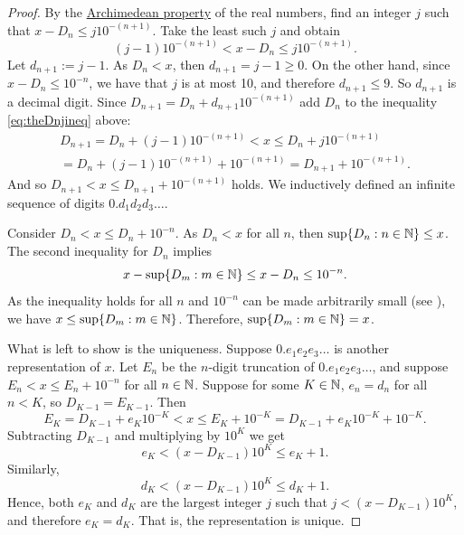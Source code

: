 \begin{proof}
By the 
\hyperref[thm:arch:i]{Archimedean property} of the real numbers,
find an integer $j$ such that
$x-D_n \leq j {10}^{-(n+1)}$.  Take the least such $j$ and obtain 
\begin{equation} \label{eq:theDnjineq}
(j-1){10}^{-(n+1)} < x-D_n \leq j {10}^{-(n+1)} .
\end{equation}
Let $d_{n+1} := j-1$.
As $D_n < x$,
then $d_{n+1} = j-1 \geq 0$.  On the other hand, since
$x-D_n \leq {10}^{-n}$, we have that
$j$ is at most 10, and therefore $d_{n+1} \leq 9$.
So $d_{n+1}$ is a
decimal digit.
Since $D_{n+1} = D_n + d_{n+1} {10}^{-(n+1)}$
add $D_n$ to the inequality
\eqref{eq:theDnjineq} above:
\begin{multline*}
D_{n+1} = D_n + (j-1){10}^{-(n+1)} < x
\leq
D_n + j {10}^{-(n+1)} \\
=
D_n + (j-1) {10}^{-(n+1)} +
{10}^{-(n+1)} = D_{n+1} + {10}^{-(n+1)} .
\end{multline*}
And so
$D_{n+1} < x \leq D_{n+1} + {10}^{-(n+1)}$ holds.
We inductively
defined an infinite sequence of digits $0.d_1d_2d_3\ldots$.

Consider $D_{n} < x \leq D_{n} + {10}^{-n}$.
As $D_n < x$ for all $n$, then
$\sup \{ D_n : n \in {\mathbb{N}} \} \leq x$.
The second inequality for $D_n$ implies
\begin{equation*}
x - \sup \{ D_m : m \in {\mathbb{N}} \}
\leq
x - D_n \leq 10^{-n} .
\end{equation*}
As the inequality holds for all $n$ and
${10}^{-n}$ can be made arbitrarily small (see
), we have $x \leq 
\sup \{ D_m : m \in {\mathbb{N}} \}$.
Therefore,
$\sup \{ D_m : m \in {\mathbb{N}} \} = x$.

What is left to show is the uniqueness.
Suppose $0.e_1e_2e_3\ldots$ is another representation of $x$.
Let $E_n$ be the $n$-digit truncation of $0.e_1e_2e_3\ldots$, and suppose
$E_n < x \leq E_n + {10}^{-n}$ for all $n \in {\mathbb{N}}$.
Suppose for some $K \in {\mathbb{N}}$, $e_n = d_n$ for all $n < K$, so
$D_{K-1} = E_{K-1}$.  Then
\begin{equation*}
E_K = D_{K-1} + e_K{10}^{-K} < x \leq E_K + {10}^{-K} = D_{K-1} +
e_K{10}^{-K} + {10}^{-K} .
\end{equation*}
Subtracting $D_{K-1}$ and multiplying by ${10}^{K}$ we get
\begin{equation*}
e_K < (x - D_{K-1}){10}^K \leq e_K + 1 .
\end{equation*}
Similarly,
\begin{equation*}
d_K < (x - D_{K-1}){10}^K \leq d_K + 1 .
\end{equation*}
Hence, both $e_K$ and $d_K$ are the largest integer $j$
such that $j < (x - D_{K-1}){10}^K$, and therefore $e_K = d_K$.  That is,
the representation is unique.
\end{proof}

